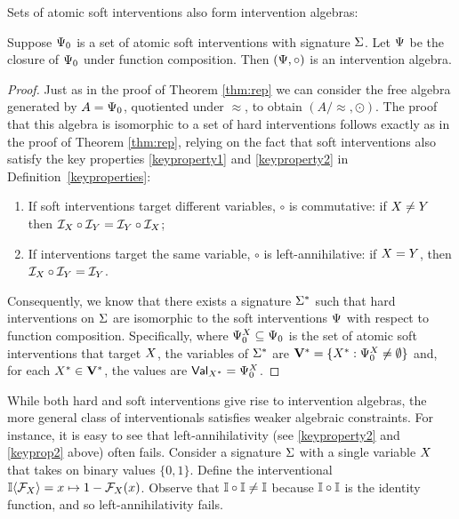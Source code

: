 \documentclass[twoside,11pt]{article}
\begin{document}
Sets of atomic soft interventions also form intervention algebras:
\begin{theorem} Suppose $\Psi_0$ is a set of atomic soft interventions with signature $\Sigma$. Let $\Psi$ be the closure of $\Psi_0$ under function composition. Then $(\Psi,\circ)$ is an intervention algebra. \label{thm:repsoft}
\end{theorem}
\begin{proof} Just as in the proof of Theorem \ref{thm:rep} we can consider the free algebra generated by $A = \Psi_0$, quotiented under $\approx$, to obtain $(A/\!\approx, \odot)$. The proof that this algebra is isomorphic to a set of hard interventions follows exactly as in the proof of Theorem \ref{thm:rep}, relying on the fact that soft interventions also satisfy the key properties \ref{keyproperty1} and \ref{keyproperty2} in Definition~\ref{keyproperties}: 
\begin{enumerate}[label=(\roman*)]
    \item If soft interventions target different variables, $\circ$ is commutative: if $X \neq Y$ then $\mathcal{I}_{X} \circ \mathcal{I}_{Y} = \mathcal{I}_{Y}  \circ \mathcal{I}_{X} $; 
    \item If interventions target the same variable, $\circ$ is left-annihilative: if $X = Y$, then $\mathcal{I}_{X}  \circ \mathcal{I}_{Y}  = \mathcal{I}_{Y} $. \label{keyprop2}
\end{enumerate} 
Consequently, we know that there exists a signature $\Sigma^*$ such that hard interventions on $\Sigma$ are isomorphic to the soft interventions $\Psi$ with respect to function composition. Specifically, where $\Psi^{X}_0\subseteq \Psi_0$ is the set of atomic soft interventions that target $X$, the variables of $\Sigma^*$ are $\mathbf{V}^* = \{X^*:  \Psi^{X}_0 \not = \emptyset \}$ and, for each $X^* \in \mathbf{V}^*$, the values are $\mathsf{Val}_{X^*} = \Psi^{X}_0$.
\end{proof}

\begin{remark} While both hard and soft interventions give rise to intervention algebras, the more general class of interventionals satisfies weaker algebraic constraints. For instance, it is easy to see that left-annihilativity (see \ref{keyproperty2} and \ref{keyprop2} above) often fails.  
Consider a signature $\Sigma$ with a single variable $X$ that takes on binary values $\{0,1\}$. Define the interventional $\mathbb{I} \langle \mathcal{F}_{X}\rangle = x \mapsto 1 - \mathcal{F}_{X}(x)$. Observe that $\mathbb{I} \circ \mathbb{I} \not = \mathbb{I}$ because $\mathbb{I} \circ \mathbb{I}$ is the identity function, and so left-annihilativity fails. 
\end{remark}
\end{document}
